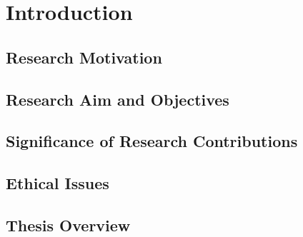 \chapter{Introduction}\label{ch:introduction}
 \setcounter{page}{1}
	
	\section{Research Motivation}
		
	\section{Research Aim and Objectives}
		
	\section{Significance of Research Contributions}
		
	\section{Ethical Issues}
		
	\section{Thesis Overview}
		